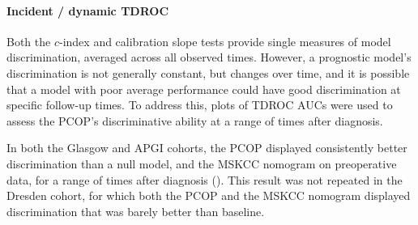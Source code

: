\documentclass[dissertation.tex]{subfiles}
\begin{document}
\paragraph{Incident / dynamic \texorpdfstring{\acrshort{TDROC}}{TD-ROC}}
Both the $c$-index and calibration slope tests provide single measures of model discrimination, averaged across all observed times.  However, a prognostic model's discrimination is not generally constant, but changes over time, and it is possible that a model with poor average performance could have good discrimination at specific follow-up times.  To address this, plots of \gls{TDROC} \glspl{AUC} were used to assess the \gls{PCOP}'s discriminative ability at a range of times after diagnosis.

In both the Glasgow and \gls{APGI} cohorts, the \gls{PCOP} displayed consistently better discrimination than a null model, and the \gls{MSKCC} nomogram on preoperative data, for a range of times after diagnosis ().  This result was not repeated in the Dresden cohort, for which both the \gls{PCOP} and the \gls{MSKCC} nomogram displayed discrimination that was barely better than baseline.
\end{document}
